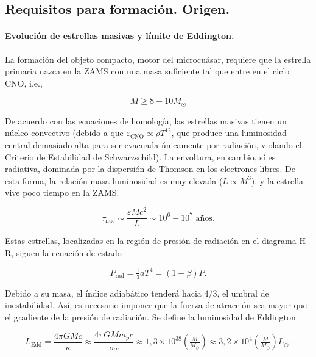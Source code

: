 \subsection{Requisitos para formación. Origen.}

\paragraph{Evolución de estrellas masivas y límite de Eddington.} La formación del objeto compacto, motor del microcuásar, requiere que la estrella primaria nazca en la ZAMS con una masa suficiente tal que entre en el ciclo CNO, i.e.,

\begin{equation}
  M\geq 8-10 M_{\odot}
\end{equation}

\noindent De acuerdo con las ecuaciones de homología, las estrellas masivas tienen un núcleo convectivo (debido a que $\varepsilon_{\mbox{CNO}}\propto\rho T^{12}$, que produce una luminosidad central demasiado alta para ser evacuada únicamente por radiación, violando el Criterio de Estabilidad de Schwarzschild). La envoltura, en cambio, sí es radiativa, dominada por la dispersión de Thomson en los electrones libres. De esta forma, la relación masa-luminosidad es muy elevada ($L\propto M^3$), y la estrella vive poco tiempo en la ZAMS.

\begin{equation}
  \tau_{\mbox{nuc}}\sim \frac{\varepsilon M c^2}{L}\sim 10^6-10^7\mbox{ años}.
\end{equation}

\noindent Estas estrellas, localizadas en la región de presión de radiación en el diagrama H-R, siguen la ecuación de estado

\begin{equation}
  P_{\mbox{rad}}=\tfrac{1}{3}aT^4=(1-\beta)P.
\end{equation}

\noindent Debido a su masa, el índice adiabático tenderá hacia $4/3$, el umbral de inestabilidad. Así, es necesario imponer que la fuerza de atracción sea mayor que el gradiente de la presión de radiación. Se define la luminosidad de Eddington

\begin{equation}
  L_{\mbox{Edd}}=\frac{4\pi GMc}{\kappa}\approx\frac{4\pi GMm_pc}{\sigma_T}\approx 1,3\times10^{38}\left(\tfrac{M}{M_{\odot}}\right)\approx 3,2\times 10^4\left(\tfrac{M}{M_{\odot}}\right)L_{\odot}.
\end{equation}

